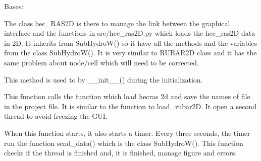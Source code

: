 \documentclass[letterpaper,10pt,english]{sphinxmanual}
\begin{document}

\begin{fulllineitems}
\label{\detokenize{index:src_GUI.hydro_GUI_2.HEC_RAS2D}}
Bases: {\hyperref[\detokenize{index:src_GUI.hydro_GUI_2.SubHydroW}]{}}

The class hec\_RAS2D is there to manage the link between the graphical interface and the functions in src/hec\_ras2D.py
which loads the hec\_ras2D data in 2D. It inherits from SubHydroW() so it have all the methods and the variables
from the class SubHydroW(). It is very similar to RUBAR2D class and it has the same problem about node/cell
which will need to be corrected.

\begin{fulllineitems}
\label{\detokenize{index:src_GUI.hydro_GUI_2.HEC_RAS2D.init_iu}}
This method is used to by \_\_init\_\_() during the initialization.

\end{fulllineitems}


\begin{fulllineitems}
\label{\detokenize{index:src_GUI.hydro_GUI_2.HEC_RAS2D.load_hec_2d_gui}}
This function calls the function which load hecras 2d and save the names of file in the project file.
It is similar to the function to load\_rubar2D. It open a second thread to avoid freezing the GUI.

When this function starts, it also starts a timer. Every three seconds, the timer run the function send\_data()
which is the class SubHydroW(). This function checks if the thread is finished and, it is finished, manage
figure and errors.

\end{fulllineitems}


\end{fulllineitems}

\end{document}
